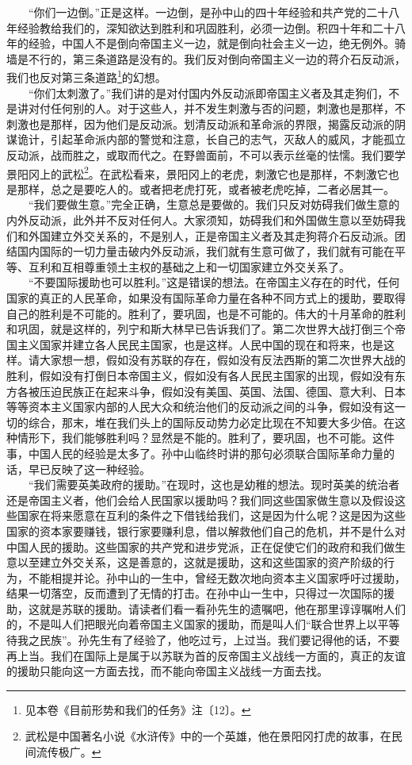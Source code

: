 \documentclass[cn,11pt,chinese]{elegantbook}
\begin{document}
　　“你们一边倒。”正是这样。一边倒，是孙中山的四十年经验和共产党的二十八年经验教给我们的，深知欲达到胜利和巩固胜利，必须一边倒。积四十年和二十八年的经验，中国人不是倒向帝国主义一边，就是倒向社会主义一边，绝无例外。骑墙是不行的，第三条道路是没有的。我们反对倒向帝国主义一边的蒋介石反动派，我们也反对第三条道路\footnote[9]{ 见本卷《目前形势和我们的任务》注〔12〕。}的幻想。\\
　　“你们太刺激了。”我们讲的是对付国内外反动派即帝国主义者及其走狗们，不是讲对付任何别的人。对于这些人，并不发生刺激与否的问题，刺激也是那样，不刺激也是那样，因为他们是反动派。划清反动派和革命派的界限，揭露反动派的阴谋诡计，引起革命派内部的警觉和注意，长自己的志气，灭敌人的威风，才能孤立反动派，战而胜之，或取而代之。在野兽面前，不可以表示丝毫的怯懦。我们要学景阳冈上的武松\footnote[10]{ 武松是中国著名小说《水浒传》中的一个英雄，他在景阳冈打虎的故事，在民间流传极广。}。在武松看来，景阳冈上的老虎，刺激它也是那样，不刺激它也是那样，总之是要吃人的。或者把老虎打死，或者被老虎吃掉，二者必居其一。\\
　　“我们要做生意。”完全正确，生意总是要做的。我们只反对妨碍我们做生意的内外反动派，此外并不反对任何人。大家须知，妨碍我们和外国做生意以至妨碍我们和外国建立外交关系的，不是别人，正是帝国主义者及其走狗蒋介石反动派。团结国内国际的一切力量击破内外反动派，我们就有生意可做了，我们就有可能在平等、互利和互相尊重领土主权的基础之上和一切国家建立外交关系了。\\
　　“不要国际援助也可以胜利。”这是错误的想法。在帝国主义存在的时代，任何国家的真正的人民革命，如果没有国际革命力量在各种不同方式上的援助，要取得自己的胜利是不可能的。胜利了，要巩固，也是不可能的。伟大的十月革命的胜利和巩固，就是这样的，列宁和斯大林早已告诉我们了。第二次世界大战打倒三个帝国主义国家并建立各人民民主国家，也是这样。人民中国的现在和将来，也是这样。请大家想一想，假如没有苏联的存在，假如没有反法西斯的第二次世界大战的胜利，假如没有打倒日本帝国主义，假如没有各人民民主国家的出现，假如没有东方各被压迫民族正在起来斗争，假如没有美国、英国、法国、德国、意大利、日本等等资本主义国家内部的人民大众和统治他们的反动派之间的斗争，假如没有这一切的综合，那末，堆在我们头上的国际反动势力必定比现在不知要大多少倍。在这种情形下，我们能够胜利吗？显然是不能的。胜利了，要巩固，也不可能。这件事，中国人民的经验是太多了。孙中山临终时讲的那句必须联合国际革命力量的话，早已反映了这一种经验。\\
　　“我们需要英美政府的援助。”在现时，这也是幼稚的想法。现时英美的统治者还是帝国主义者，他们会给人民国家以援助吗？我们同这些国家做生意以及假设这些国家在将来愿意在互利的条件之下借钱给我们，这是因为什么呢？这是因为这些国家的资本家要赚钱，银行家要赚利息，借以解救他们自己的危机，并不是什么对中国人民的援助。这些国家的共产党和进步党派，正在促使它们的政府和我们做生意以至建立外交关系，这是善意的，这就是援助，这和这些国家的资产阶级的行为，不能相提并论。孙中山的一生中，曾经无数次地向资本主义国家呼吁过援助，结果一切落空，反而遭到了无情的打击。在孙中山一生中，只得过一次国际的援助，这就是苏联的援助。请读者们看一看孙先生的遗嘱吧，他在那里谆谆嘱咐人们的，不是叫人们把眼光向着帝国主义国家的援助，而是叫人们“联合世界上以平等待我之民族”。孙先生有了经验了，他吃过亏，上过当。我们要记得他的话，不要再上当。我们在国际上是属于以苏联为首的反帝国主义战线一方面的，真正的友谊的援助只能向这一方面去找，而不能向帝国主义战线一方面去找。\\
\end{document}
